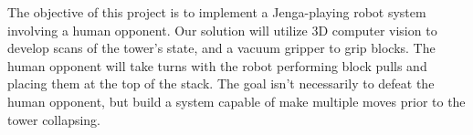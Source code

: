 The objective of this project is to implement a Jenga-playing robot system involving a human opponent. Our solution will utilize 3D computer vision to develop scans of the tower's state, and a vacuum gripper to grip blocks. The human opponent will take turns with the robot performing block pulls and placing them at the top of the stack. The goal isn't necessarily to defeat the human opponent, but build a system capable of make multiple moves prior to the tower collapsing. 